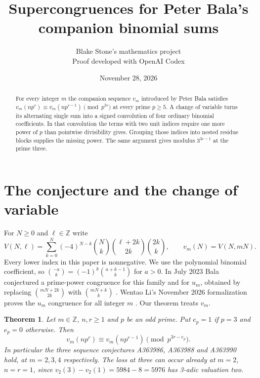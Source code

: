 \documentclass[11pt]{article}
\title{Supercongruences for Peter Bala's companion binomial sums}
\author{Blake Stone's mathematics project\\\small Proof developed with OpenAI Codex}
\date{November 28, 2026}
\newtheorem{theorem}{Theorem}
\newcommand{\Z}{\mathbb Z}
\begin{document}
\maketitle
\begin{abstract}
For every integer $m$ the companion sequence $v_m$ introduced by Peter Bala satisfies
$v_m(np^r)\equiv v_m(np^{r-1})\pmod {p^{3r}}$ at every prime $p\ge5$.
A change of variable turns its alternating single sum into a signed convolution of four ordinary binomial coefficients.
In that convolution the terms with two unit indices require one more power of $p$ than pointwise divisibility gives.
Grouping those indices into nested residue blocks supplies the missing power. The same argument gives modulus $3^{3r-1}$ at the prime three.
\end{abstract}

\section{The conjecture and the change of variable}
For $N\ge0$ and $\ell\in\Z$ write
\[
 V(N,\ell)=\sum_{k=0}^N(-4)^{N-k}\binom Nk
       \binom{\ell+2k}{2k}\binom{2k}{k},\qquad v_m(N)=V(N,mN).
\]
Every lower index in this paper is nonnegative. We use the polynomial binomial coefficient, so $\binom{-a}{k}=(-1)^k\binom{a+k-1}{k}$ for $a>0$.
In July 2023 Bala conjectured a prime-power congruence for this family and for
$u_m$, obtained by replacing $\binom{mN+2k}{2k}$ with $\binom{mN+k}{k}$ \cite{bala}.
Wentao Li's November 2026 formalization proves the $u_m$ congruence for all integer $m$ \cite{li}. Our theorem treats $v_m$.

\begin{theorem}\label{main}
Let $m\in\Z$, $n,r\ge1$ and $p$ be an odd prime. Put $e_p=1$ if $p=3$ and $e_p=0$ otherwise. Then
\[
 v_m(np^r)\equiv v_m(np^{r-1})\pmod {p^{3r-e_p}}.
\]
In particular the three sequence conjectures A363986, A363988 and A363990 hold, at $m=2,3,4$ respectively. The loss at three can occur already at $m=2$, $n=r=1$, since $v_2(3)-v_2(1)=5984-8=5976$ has 3-adic valuation two.
\end{theorem}
\end{document}
